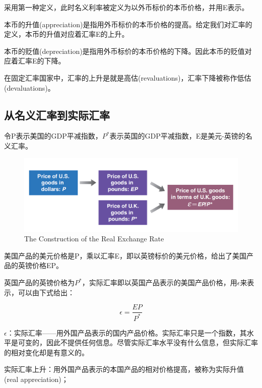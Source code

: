 \documentclass{article}
\begin{document}
采用第一种定义，此时名义利率被定义为以外币标价的本币价格，并用E表示。

本币的升值(appreciation)是指用外币标价的本币价格的提高。给定我们对汇率的定义，本币的升值对应着汇率E的上升。

本币的贬值(depreciation)是指用外币标价的本币价格的下降。因此本币的贬值对应着汇率E的下降。

\hspace*{\fill}

在固定汇率国家中，汇率的上升是就是高估(revaluations)，汇率下降被称作低估(devaluations)。

\subsection{从名义汇率到实际汇率}

令P表示美国的GDP平减指数，$ P^* $表示英国的GDP平减指数，E是美元-英镑的名义汇率。

\begin{figure}[H] %
	\centering %
	\includegraphics[width=1\textwidth]{17_1} %
	\caption{The Construction of the
		Real Exchange Rate} %
	\label{Fig.main2} %
\end{figure}

美国产品的美元价格是P，乘以汇率E，即以英镑标价的美元价格，给出了美国产品的英镑价格EP。

英国产品的英镑价格为$ P^* $，实际汇率即以英国产品表示的美国产品价格，用$ \epsilon $来表示，可以由下式给出：

\[
\epsilon=\frac{EP}{P^*}
\]

$ \epsilon $：实际汇率——用外国产品表示的国内产品价格。实际汇率只是一个指数，其水平是可变的，因此不提供任何信息。尽管实际汇率水平没有什么信息，但实际汇率的相对变化却是有意义的。

\hspace*{\fill}

实际汇率上升：用外国产品表示的本国产品的相对价格提高，被称为实际升值(real appreciation)；
\end{document}

